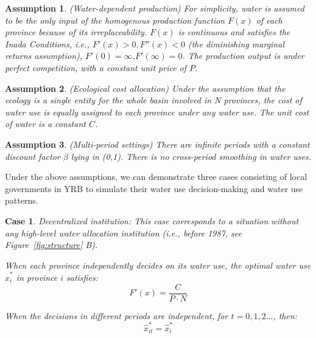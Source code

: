 \documentclass{article}
\newtheorem{ass}{Assumption}
\newtheorem{case}{Case}
\begin{document}
\begin{ass}
    (Water-dependent production) For simplicity, water is assumed to be the only input of the homogenous production function $F(x)$ of each province because of its irreplaceability. $F(x)$ is continuous and satisfies the Inada Conditions, i.e., $F'(x)>0, F''(x)<0$ (the diminishing marginal returns assumption), $F'(0)=\infty$,$ F'(\infty)=0$. The production output is under perfect competition, with a constant unit price of $P$.
\end{ass}
\begin{ass}
    (Ecological cost allocation) Under the assumption that the ecology is a single entity for the whole basin involved in N provinces, the cost of water use is equally assigned to each province under any water use. The unit cost of water is a constant $C$.
\end{ass}
\begin{ass}
    (Multi-period settings) There are infinite periods with a constant discount factor $\beta$ lying in (0,1). There is no cross-period smoothing in water uses.
\end{ass}

Under the above assumptions, we can demonstrate three cases consisting of local governments in YRB to simulate their water use decision-making and water use patterns.

\begin{case} Decentralized institution:
    This case corresponds to a situation without any high-level water allocation institution (i.e., before 1987, see Figure~\ref{fig:structure} B).

    When each province independently decides on its water use, the optimal water use $\hat x_i^*$ in province $i$ satisfies:
    $$F'(x)=\frac{C}{P \cdot N}$$

    When the decisions in different periods are independent, for $t=0,1,2 \ldots$, then:
    $$\hat x_{it}^*=\hat x_i^*$$

\end{case}
\end{document}
